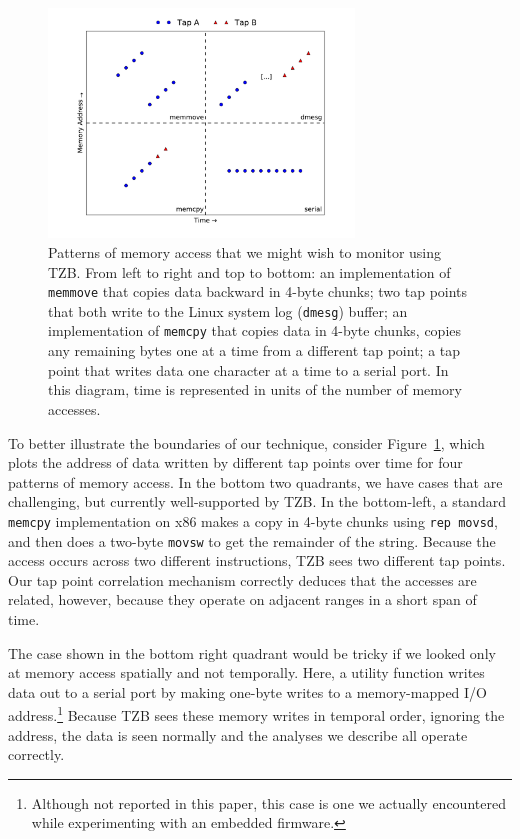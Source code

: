 \begin{figure}[t]
    \begin{center}
        \includegraphics[width=3.2in]{figures/memaccess.pdf}
    \end{center}
    \caption{Patterns of memory access that we might wish to monitor
    using TZB. From left to right and top to bottom: an implementation
    of \texttt{memmove} that copies data backward in 4-byte chunks; two
    tap points that both write to the Linux system log (\texttt{dmesg})
    buffer; an implementation of \texttt{memcpy} that copies data in
    4-byte chunks, copies any remaining bytes one at a time from a
    different tap point; a tap point that writes data one character at
    a time to a serial port. In this diagram, time is represented in
    units of the number of memory accesses.}
    \label{fig:memaccess}
\end{figure}

To better illustrate the boundaries of our technique, consider
Figure~\ref{fig:memaccess}, which plots the address of data written by
different tap points over time for four patterns of memory access. In
the bottom two quadrants, we have cases that are challenging, but
currently well-supported by TZB. In the bottom-left, a standard
\texttt{memcpy} implementation on x86 makes a copy in 4-byte chunks
using \texttt{rep movsd}, and then does a two-byte \texttt{movsw} to get
the remainder of the string. Because the access occurs across two
different instructions, TZB sees two different tap points. Our tap point
correlation mechanism correctly deduces that the accesses are related,
however, because they operate on adjacent ranges in a short span of
time.

The case shown in the bottom right quadrant would be tricky if we looked
only at memory access spatially and not temporally. Here, a utility
function writes data out to a serial port by making one-byte writes to a
memory-mapped I/O address.\footnote{Although not reported in this paper,
this case is one we actually encountered while experimenting with an
embedded firmware.} Because TZB sees these memory writes in
temporal order, ignoring the address, the data is seen normally and the
analyses we describe all operate correctly.

